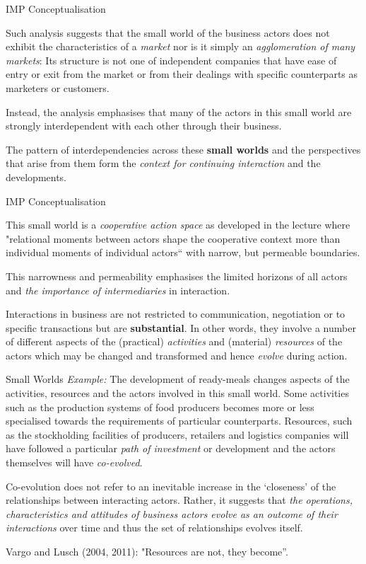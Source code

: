 \documentclass{beamer}
\begin{document}
\begin{frame}{IMP Conceptualisation}

Such analysis suggests that the small world of the business actors does not
exhibit the characteristics of a \emph{market} nor is it simply an
\emph{agglomeration of many markets}: Its structure is not one of independent
companies that have ease of entry or exit from the market or from their
dealings with speciﬁc counterparts as marketers or customers.

Instead, the analysis emphasises that many of the actors in this small world
are strongly interdependent with each other through their business.

The pattern of interdependencies across these \textbf{small worlds} and the
perspectives that arise from them form the \emph{context for continuing
  interaction} and the developments.

\end{frame}

\begin{frame}{IMP Conceptualisation}

This small world is a \emph{cooperative action space} as developed in the
lecture where "relational moments between actors shape the cooperative context
more than individual moments of individual actors“ with narrow, but permeable
boundaries.

This narrowness and permeability emphasises the limited horizons of all actors
and \emph{the importance of intermediaries} in interaction.

Interactions in business are not restricted to communication, negotiation or
to speciﬁc transactions but are \textbf{substantial}. In other words, they
involve a number of different aspects of the (practical) \emph{activities} and
(material) \emph{resources} of the actors which may be changed and transformed
and hence \emph{evolve} during action. 
\end{frame}

\begin{frame}{Small Worlds}
\emph{Example:} The development of ready-meals changes aspects of the
activities, resources and the actors involved in this small world. Some
activities such as the production systems of food producers becomes more or
less specialised towards the requirements of particular counterparts.
Resources, such as the stockholding facilities of producers, retailers and
logistics companies will have followed a particular \emph{path of investment}
or development and the actors themselves will have \emph{co-evolved}.

Co-evolution does not refer to an inevitable increase in the ‘closeness’ of
the relationships between interacting actors. Rather, it suggests that
\emph{the operations, characteristics and attitudes of business actors evolve
  as an outcome of their interactions} over time and
thus the set of relationships evolves itself.

Vargo and Lusch (2004, 2011): "Resources are not, they become”.

\end{frame}
\end{document}
